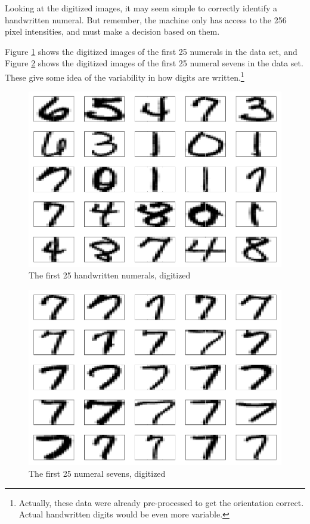 \documentclass[
]{krantz}
\begin{document}
Looking at the digitized images, it may seem simple to correctly identify a handwritten numeral. But remember, the machine only has access to the 256 pixel intensities, and must make a decision based on them.

Figure \ref{fig:25digits} shows the digitized images of the first 25 numerals in the data set, and Figure \ref{fig:25Sevens} shows the digitized images of the first 25 numeral sevens in the data set. These give some idea of the variability in how digits are written.\footnote{Actually, these data were already pre-processed to get the orientation correct. Actual handwritten digits would be even more variable.}

\begin{figure}
\centering
\includegraphics{bookdown_files/figure-latex/25digits-1.pdf}
\caption{\label{fig:25digits}The first 25 handwritten numerals, digitized}
\end{figure}

\begin{figure}
\centering
\includegraphics{bookdown_files/figure-latex/25Sevens-1.pdf}
\caption{\label{fig:25Sevens}The first 25 numeral sevens, digitized}
\end{figure}
\end{document}
